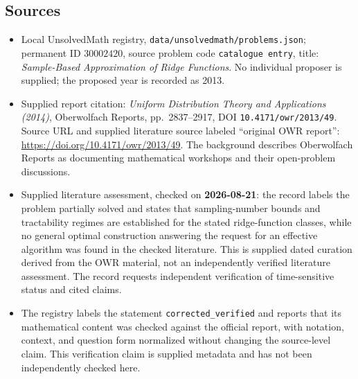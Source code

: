 \documentclass[11pt]{article}
\begin{document}
\subsection{Sources}
\begin{itemize}
\item Local UnsolvedMath registry, \texttt{data/unsolvedmath/problems.json}; permanent ID \(30002420\), source problem code \texttt{catalogue entry}, title: \emph{Sample-Based Approximation of Ridge Functions}. No individual proposer is supplied; the proposed year is recorded as 2013.
\item Supplied report citation: \emph{Uniform Distribution Theory and Applications (2014)}, Oberwolfach Reports, pp.\ 2837--2917, DOI \texttt{10.4171/owr/2013/49}. Source URL and supplied literature source labeled ``original OWR report'': \url{https://doi.org/10.4171/owr/2013/49}. The background describes Oberwolfach Reports as documenting mathematical workshops and their open-problem discussions.
\item Supplied literature assessment, checked on \textbf{2026-08-21}: the record labels the problem partially solved and states that sampling-number bounds and tractability regimes are established for the stated ridge-function classes, while no general optimal construction answering the request for an effective algorithm was found in the checked literature. This is supplied dated curation derived from the OWR material, not an independently verified literature assessment. The record requests independent verification of time-sensitive status and cited claims.
\item The registry labels the statement \texttt{corrected\_verified} and reports that its mathematical content was checked against the official report, with notation, context, and question form normalized without changing the source-level claim. This verification claim is supplied metadata and has not been independently checked here.
\end{itemize}
\end{document}
